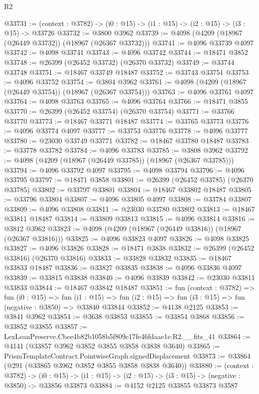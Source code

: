 \begin{lexlean}{R2}
\begin{coremodule}
@33731 := (context : @3782) -> (i0 : @15) -> (i1 : @15) -> (i2 : @15) -> (i3 : @15) -> @33726
@33732 := @3800 @3962
@33739 := @4098 (@4209 (@18967 (@26449 @33732)) (@18967 (@26367 @33732)))
@33741 := @4096 @33739 @4097
@33742 := @4098 @33741
@33743 := @4096 @33742
@33744 := @18471 @3852
@33748 := @26399 (@26452 @33732) (@26370 @33732)
@33749 := @33744 @33748
@33751 := @18467 @33749 @18487
@33752 := @33743 @33751
@33753 := @4096 @33752
@33754 := @3804 @3962
@33761 := @4098 (@4209 (@18967 (@26449 @33754)) (@18967 (@26367 @33754)))
@33763 := @4096 @33761 @4097
@33764 := @4098 @33763
@33765 := @4096 @33764
@33766 := @18471 @3855
@33770 := @26399 (@26452 @33754) (@26370 @33754)
@33771 := @33766 @33770
@33773 := @18467 @33771 @18487
@33774 := @33765 @33773
@33776 := @4096 @33774 @4097
@33777 := @33753 @33776
@33778 := @4096 @33777
@33780 := @23030 @33749 @33771
@33782 := @18467 @33780 @18487
@33783 := @33778 @33782
@33784 := @4096 @33783
@33785 := @3808 @3962
@33792 := @4098 (@4209 (@18967 (@26449 @33785)) (@18967 (@26367 @33785)))
@33794 := @4096 @33792 @4097
@33795 := @4098 @33794
@33796 := @4096 @33795
@33797 := @18471 @3858
@33801 := @26399 (@26452 @33785) (@26370 @33785)
@33802 := @33797 @33801
@33804 := @18467 @33802 @18487
@33805 := @33796 @33804
@33807 := @4096 @33805 @4097
@33808 := @33784 @33807
@33809 := @4096 @33808
@33811 := @23030 @33780 @33802
@33813 := @18467 @33811 @18487
@33814 := @33809 @33813
@33815 := @4096 @33814
@33816 := @3812 @3962
@33823 := @4098 (@4209 (@18967 (@26449 @33816)) (@18967 (@26367 @33816)))
@33825 := @4096 @33823 @4097
@33826 := @4098 @33825
@33827 := @4096 @33826
@33828 := @18471 @3838
@33832 := @26399 (@26452 @33816) (@26370 @33816)
@33833 := @33828 @33832
@33835 := @18467 @33833 @18487
@33836 := @33827 @33835
@33838 := @4096 @33836 @4097
@33839 := @33815 @33838
@33840 := @4096 @33839
@33842 := @23030 @33811 @33833
@33844 := @18467 @33842 @18487
@33851 := fun (context : @3782) =>
  fun (i0 : @15) =>
  fun (i1 : @15) => fun (i2 : @15) => fun (i3 : @15) => fun (negative : @3850) => @33840 @33844
@33852 := @4138 @2125
@33853 := @3841 @3962
@33854 := @3638 @33853
@33855 := @33854 @3868
@33856 := @33852 @33855
@33857 := LexLeanPreserve.Cbee4b82b1058b5f809e17fe46fdaae1e.R2.__fits_41
@33864 := @4141 (@33857 @3962 @3852 @3855 @3858 @3838 @3640)
@33865 := PrismTemplateContract.PointwiseGraph.signedDisplacement
@33873 := @33864 (@291 (@33865 @3962 @3852 @3855 @3858 @3838 @3640))
@33880 := (context : @3782) ->
  (i0 : @15) -> (i1 : @15) -> (i2 : @15) -> (i3 : @15) -> (negative : @3850) -> @33856 @33873
@33884 := @4152 @2125 @33855 @33873 @3587

\end{coremodule}
\end{lexlean}
